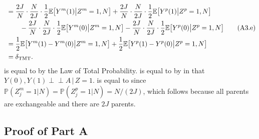 \documentclass[12pt]{extarticle}
\newcommand{\ind}{\perp\!\!\!\!\perp}
\newcommand{\pp}{\mathbb{P}}
\newcommand{\E}{\mathbb{E}}
\newcommand{\nind}{J}
\newcommand{\tmt}{{\normalfont \text{TMT}}}
\begin{document}
{\begin{align}
\ &= \frac{2\nind}{N}\cdot \frac{N}{2\nind}\cdot \frac{1}{2}\E\big[Y^m(1)\big|Z^m=1,N\big] + \frac{2\nind}{N}\cdot \frac{N}{2\nind}\cdot \frac{1}{2} \E\big[Y^p(1)\big|Z^p=1,N\big] \nonumber \\
\ & \qquad - \frac{2\nind}{N}\cdot \frac{N}{2\nind}\cdot \frac{1}{2}\E\big[Y^m(0)\big|Z^m=1,N\big] - \frac{2\nind}{N}\cdot \frac{N}{2\nind}\cdot \frac{1}{2} \E\big[Y^p(0)\big|Z^p=1,N\big] \tag{A3.e} \label{eq:a5} \\
\ & = \frac{1}{2}\E\big[Y^m(1)-Y^m(0)\big|Z^m=1,N\big]+\frac{1}{2}\E\big[Y^p(1)-Y^p(0)\big|Z^p=1,N\big] \nonumber \\
\ & = \delta_{\tmt}. \nonumber
\end{align}} 
 is equal to  by the Law of Total Probability.  is equal to  by  in that $Y(0),Y(1) \ind A \, \big| \, Z=1.$  is equal to  since $\pp(Z^m_j=1 | N) = \pp(Z^p_j=1 | N) = N/(2J)$, which follows because all parents are exchangeable and there are $2J$ parents. 

\subsection{Proof of  Part A} \label{app:muc_unbiased}
\end{document}
